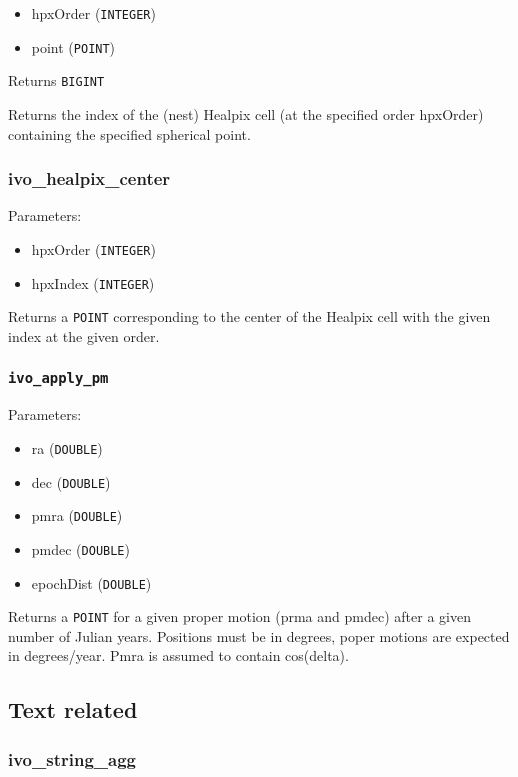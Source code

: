 \documentclass[11pt,a4paper]{ivoa}
\begin{document}
\begin{itemize}
	\item hpxOrder (\texttt{INTEGER})
	\item point (\texttt{POINT})
\end{itemize}

Returns \texttt{BIGINT}

Returns the index of the (nest) Healpix cell (at the specified order
hpxOrder) containing the specified spherical point.

\subsubsection{ivo\_healpix\_center}

Parameters:

\begin{itemize}
	\item hpxOrder (\texttt{INTEGER})
	\item hpxIndex (\texttt{INTEGER})
\end{itemize}

Returns a \texttt{POINT} corresponding to the center of the Healpix cell
with the given index at the given order.

\subsubsection{\texttt{ivo\_apply\_pm}}

Parameters:

\begin{itemize}
	\item ra (\texttt{DOUBLE})
	\item dec (\texttt{DOUBLE})
	\item pmra (\texttt{DOUBLE})
	\item pmdec (\texttt{DOUBLE})
	\item epochDist (\texttt{DOUBLE})
\end{itemize}

Returns a \texttt{POINT} for a given proper motion (prma and pmdec)
after a given number of Julian years. Positions must be in degrees,
poper motions are expected in degrees/year. Pmra is assumed to contain
cos(delta).


\subsection{Text related}

\subsubsection{ivo\_string\_agg}
\end{document}
